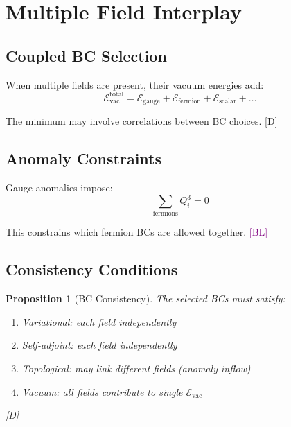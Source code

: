 \documentclass[11pt,a4paper]{article}
\newtheorem{proposition}[theorem]{Proposition}
\newcommand{\tagD}{\textcolor{blue!70!black}{[D]}}
\newcommand{\tagBL}{\textcolor{purple}{[BL]}}
\begin{document}
\section{Multiple Field Interplay}

\subsection{Coupled BC Selection}

When multiple fields are present, their vacuum energies add:
\begin{equation}
\label{eq:coupled-vac}
\mathcal{E}_{\text{vac}}^{\text{total}} = \mathcal{E}_{\text{gauge}} + \mathcal{E}_{\text{fermion}} + \mathcal{E}_{\text{scalar}} + \ldots
\end{equation}

The minimum may involve correlations between BC choices. \tagD

\subsection{Anomaly Constraints}

Gauge anomalies impose:
\begin{equation}
\label{eq:anomaly}
\sum_{\text{fermions}} Q_i^3 = 0
\end{equation}

This constrains which fermion BCs are allowed together. \tagBL

\subsection{Consistency Conditions}

\begin{proposition}[BC Consistency]
\label{prop:bc-consistency}
The selected BCs must satisfy:
\begin{enumerate}
    \item Variational: each field independently
    \item Self-adjoint: each field independently
    \item Topological: may link different fields (anomaly inflow)
    \item Vacuum: all fields contribute to single $\mathcal{E}_{\text{vac}}$
\end{enumerate}
\tagD
\end{proposition}
\end{document}

